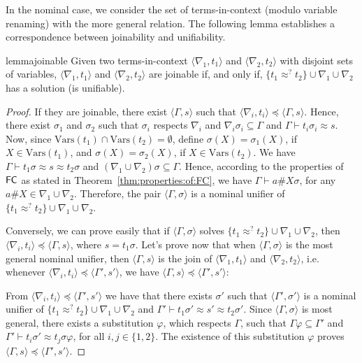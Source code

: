\documentclass{llncs}
\newcommand{\vars}{\mathrm{Vars}}
\newcommand{\np}[2]{\langle #1, \allowbreak #2\rangle}
\newcommand{\fe}{{\sf FC}}
\begin{document}
In the nominal case, we consider the set of terms-in-context (modulo variable
renaming) with the more general relation. The following lemma
establishes a correspondence between joinability and unifiability.

\begin{restatable}{lemma}{joinable}
 \label{lemma:unif:join}
Given two terms-in-context $\np{\nabla_1}{t_1}$ and
$\np{\nabla_2}{t_2}$ with disjoint sets of variables,
$\np{\nabla_1}{t_1}$ and $\np{\nabla_2}{t_2}$ are joinable if, and
only if, $\{t_1\approx^? t_2\}\cup\nabla_1\cup\nabla_2$ has a solution
(is unifiable).
\end{restatable}

\begin{proof}
If they are joinable, there exist $\np{\Gamma}{s}$ such that
$\np{\nabla_i}{t_i} \preceq \np{\Gamma}{s}$. Hence, there exist
$\sigma_1$ and $\sigma_2$ such that $\sigma_i$ respects $\nabla_i$ and
$\nabla_i\sigma_i\subseteq\Gamma$ and $\Gamma\vdash t_i\sigma_i
\approx s$.  Now, since $\vars(t_1) \cap \vars(t_2)=\emptyset$, define
$\sigma(X) = \sigma_1(X)$, if $X\in\vars(t_1)$, and $\sigma(X) =
\sigma_2(X)$, if $X\in\vars(t_2)$. We have $\Gamma\vdash
t_1\sigma\approx s\approx t_2\sigma$ and
$(\nabla_1\cup\nabla_2)\sigma\subseteq\Gamma$.  Hence, according to
the properties of $\fe$ as stated in Theorem~\ref{thm:properties:of:FC}, we have $\Gamma\vdash a\#X\sigma$, for any $a\#X\in
\nabla_1\cup\nabla_2$.  Therefore, the pair
$\langle\Gamma,\sigma\rangle$ is a nominal unifier of $\{t_1\approx^?
t_2\}\cup\nabla_1\cup\nabla_2$.

Conversely, we can prove easily that if $\langle\Gamma,\sigma\rangle$
solves $\{t_1\approx^?  t_2\}\cup\nabla_1\cup\nabla_2$, then
$\np{\nabla_i}{t_i} \preceq \np{\Gamma}{s}$, where $s=t_1\sigma$.
Let's prove now that when $\langle\Gamma,\sigma\rangle$ is the most
general nominal unifier, then $\np{\Gamma}{s}$ is the join of
$\np{\nabla_1}{t_1}$ and $\np{\nabla_2}{t_2}$, i.e.  whenever
$\np{\nabla_i}{t_i}\preceq\np{\Gamma'}{s'}$, we have
$\np{\Gamma}{s}\preceq\np{\Gamma'}{s'}$:

From $\np{\nabla_i}{t_i}\preceq\np{\Gamma'}{s'}$ we have that there exists
$\sigma'$ such that $\langle\Gamma',\sigma'\rangle$ is a nominal
unifier of $\{t_1\approx^?  t_2\}\cup\nabla_1\cup\nabla_2$ and
$\Gamma'\vdash t_1\sigma'\approx s' \approx t_2\sigma'$. Since $\langle\Gamma,\sigma\rangle$ is most general, there exists a
substitution $\varphi$, which respects $\Gamma$, such that $\Gamma\varphi\subseteq\Gamma'$ and
$\Gamma'\vdash t_i\sigma' \approx t_j\sigma\varphi $, for all $i,j\in\{1,2\}$.  The existence of this
substitution $\varphi$ proves
$\np{\Gamma}{s}\preceq\np{\Gamma'}{s'}$.
\end{proof}
\end{document}
